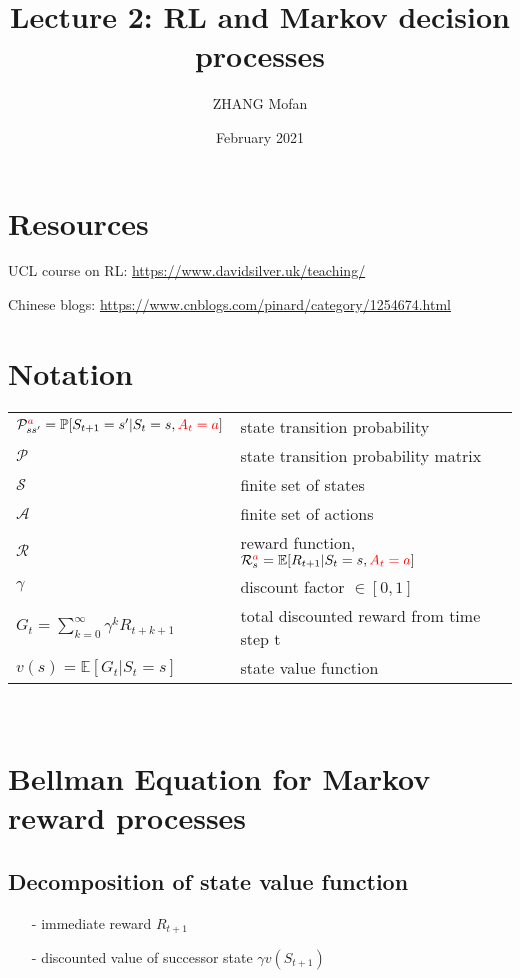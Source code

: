 \documentclass{article}
\title{Lecture 2: RL and Markov decision processes}
\author{ZHANG Mofan}
\date{February 2021}
\begin{document}
\maketitle
\setcounter{section}{-1}
\section{Resources}
UCL course on RL: \url{https://www.davidsilver.uk/teaching/}

Chinese blogs: \url{https://www.cnblogs.com/pinard/category/1254674.html}

\section{Notation}
\begin{tabular}{lp{}}
$\mathcal{P}_{ss'}^{\textcolor{red}{a}} = \mathbb{P}[S_{t+1} = s'|S_t = s, {\color{red}A_t = a}]$ & state transition probability\\

$\mathcal{P}$ & state transition probability matrix\\

$\mathcal{S}$ & finite set of states\\

\color{red} $\mathcal{A}$ & finite set of actions\\

$\mathcal{R}$ & reward function, $\mathcal{R}_{s}^{\textcolor{red}{a}} = \mathbb{E}[R_{t+1}|S_t = s, {\color{red}A_t = a}]$\\

$\gamma$ & discount factor $\in [0, 1]$\\

$G_t = \sum^{\infty}_{k=0} \gamma^kR_{t+k+1}$ & total discounted reward from time step t\\

$v(s) = \mathbb{E}[G_t|S_t = s]$ & state value function\\
\end{tabular}\\

\section{Bellman Equation for Markov reward processes}
\subsection{Decomposition of state value function}
\begin{itemize}
    \item[-] immediate reward $R_{t+1}$
    \item[-] discounted value of successor state $\gamma v(S_{t+1})$
\end{itemize}
\end{document}
